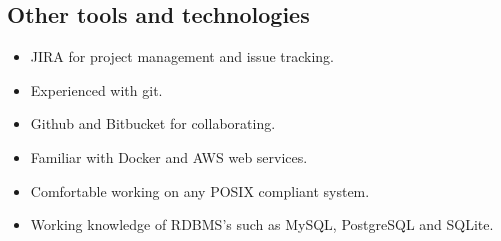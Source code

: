 \documentclass{article}
\begin{document}
\subsection{Other tools and technologies}
\begin{itemize}
\item JIRA for project management and issue tracking.
\item Experienced with git.
\item Github and Bitbucket for collaborating.
\item Familiar with Docker and AWS web services.
\item Comfortable working on any POSIX compliant system.
\item Working knowledge of RDBMS’s such as MySQL, PostgreSQL and SQLite.
\end{itemize}
\end{document}
